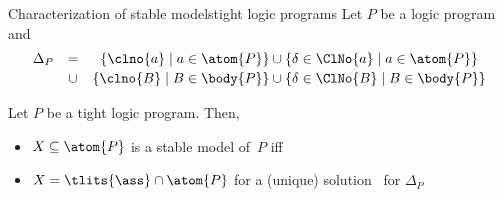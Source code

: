 \begin{frame}{Characterization of stable models}{tight logic programs}
\medskip
Let $P$ be a logic program and
\[
\begin{array}{lcr@{}c@{}l}
\Delta_P
& = &
\{\clno{a} \mid a\in\atom{P}\}
& {} \cup {} &
\{\delta\in\ClNo{a} \mid a\in\atom{P}\}
\\[2pt]
& \cup &
\{\clno{B} \mid B\in\body{P}\}
& {} \cup {} &
\{\delta\in\ClNo{B}\mid B\in\body{P}\}
\end{array}
\]
\begin{center}\pause
  \begin{minipage}[t]{0.8\linewidth}
    \begin{theorem}
      Let $P$ be a \alert{tight} logic program. Then,
      \par\smallskip
      \begin{itemize}
      \item [] $X\subseteq\atom{P}$ is a stable model of~$P$ iff
      \item [] $X=\tlits{\ass}\cap\atom{P}$ for a (unique) solution \ass\ for $\Delta_P$
      \end{itemize}
    \end{theorem}
  \end{minipage}
\end{center}
\end{frame}
%
